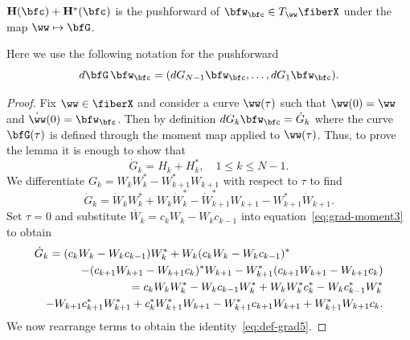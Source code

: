\begin{lemma}
    \label{le:grad-moment-2} 
    $\mathbf{H}(\bfc)+ \mathbf{H}^*(\bfc)$ is the pushforward of $\bfw_\bfc \in T_\ww \fiberX$ under the map $\ww \mapsto \bfG$. 
  \end{lemma}
Here we use the following notation for the pushforward
  \begin{equation}
  d\bfG \,\bfw_\bfc = (dG_{N-1}\bfw_\bfc,\ldots,dG_1\bfw_\bfc).    
  \end{equation}
\begin{proof}
Fix $\ww \in \fiberX$ and consider a curve $\ww(\tau)$ such that $\ww(0)=\ww$ and $\dot{\ww}(0)=\bfw_\bfc$. Then by definition $dG_k \bfw_\bfc= \dot{G}_k$ where the curve $\bfG(\tau)$ is defined through the moment map applied to $\ww(\tau)$. Thus, to prove the lemma it is enough to show that
   \begin{equation}
    \label{eq:def-grad5}
        \dot{G}_k = H_k +H_k^*, \quad 1\leq k \leq N-1.        
    \end{equation}
We differentiate $G_k = W_k W_k^* - W_{k+1}^* W_{k+1}$ with respect to $\tau$ to find
\begin{equation}
\label{eq:grad-moment3}
\dot{G}_k = \dot{W}_k W_k^* + W_k \dot{W}_k^* - \dot{W}_{k+1}^* W_{k+1} - W_{k+1}^* \dot{W}_{k+1}.
\end{equation}
Set $\tau=0$ and substitute $\dot{W_k} = c_k W_k - W_k c_{k-1}$ into equation~\eqref{eq:grad-moment3} to obtain
\begin{eqnarray}
\label{eq:grad-moment4}
\lefteqn{\dot{G}_k = (c_k W_k- W_k c_{k-1}) W_k^* + W_k (c_k W_k- W_k c_{k-1})^*}
\\ \nonumber
&& - (c_{k+1} W_{k+1}- W_{k+1} c_{k})^* W_{k+1} - W_{k+1}^*(c_{k+1} W_{k+1}- W_{k+1} c_{k})
\\ \nonumber
&& = c_k W_k W_k^*- W_k c_{k-1} W_k^* + W_k W_k^*c_k^*- W_k c_{k-1}^*W_k^* 
\\ \nonumber 
&& -W_{k+1}c_{k+1}^*W_{k+1}^*+ c_{k}^*W_{k+1}^* W_{k+1} - W_{k+1}^*c_{k+1} W_{k+1} + W_{k+1}^*W_{k+1} c_{k}.
\end{eqnarray}
We now rearrange terms to obtain  the identity~\eqref{eq:def-grad5}.
\end{proof}

